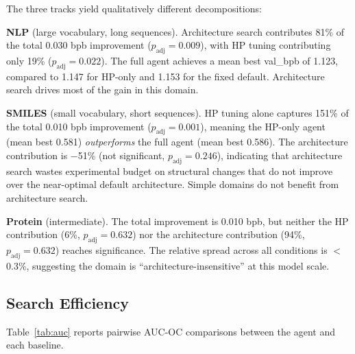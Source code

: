 The three tracks yield qualitatively different decompositions:

\textbf{NLP} (large vocabulary, long sequences). Architecture search contributes 81\% of the total 0.030 bpb improvement ($p_\text{adj} = 0.009$), with HP tuning contributing only 19\% ($p_\text{adj} = 0.022$). The full agent achieves a mean best val\_bpb of 1.123, compared to 1.147 for HP-only and 1.153 for the fixed default. Architecture search drives most of the gain in this domain.

\textbf{SMILES} (small vocabulary, short sequences). HP tuning alone captures 151\% of the total 0.010 bpb improvement ($p_\text{adj} = 0.001$), meaning the HP-only agent (mean best 0.581) \emph{outperforms} the full agent (mean best 0.586). The architecture contribution is $-$51\% (not significant, $p_\text{adj} = 0.246$), indicating that architecture search wastes experimental budget on structural changes that do not improve over the near-optimal default architecture. Simple domains do not benefit from architecture search.

\textbf{Protein} (intermediate). The total improvement is 0.010 bpb, but neither the HP contribution (6\%, $p_\text{adj} = 0.632$) nor the architecture contribution (94\%, $p_\text{adj} = 0.632$) reaches significance. The relative spread across all conditions is $<$0.3\%, suggesting the domain is ``architecture-insensitive'' at this model scale.

\subsection{Search Efficiency}
\label{sec:search_efficiency}

Table~\ref{tab:auc} reports pairwise AUC-OC comparisons between the agent and each baseline.

